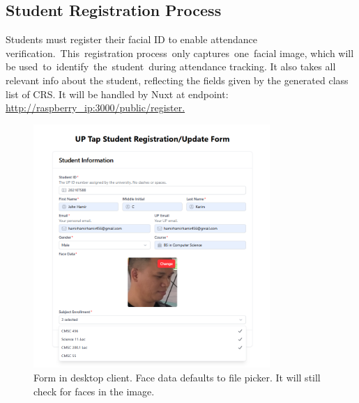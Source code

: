 \subsection{Student Registration Process}
Students must register their facial ID to enable attendance verification. This registration process only captures one facial image, which will be used to identify the student during attendance tracking. It also takes all relevant info about the student, reflecting the fields given by the generated class list of CRS. It will be handled by Nuxt at endpoint: \url{http://raspberry_ip:3000/public/register. }
\begin{figure}[h] %
	\centering
	\includegraphics[width=0.8\textwidth]{figures/chapter4/student_form_pc.png} %
	\caption{Form in desktop client. Face data defaults to file picker. It will still check for faces in the image.}
	\label{fig:student_form_pc}
\end{figure}
\clearpage

